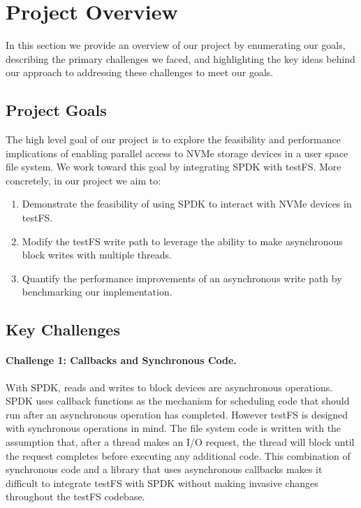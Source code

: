 \section{Project Overview}
In this section we provide an overview of our project by enumerating our goals,
describing the primary challenges we faced, and highlighting the key ideas
behind our approach to addressing these challenges to meet our goals.

\subsection{Project Goals}
The high level goal of our project is to explore the feasibility and
performance implications of enabling parallel access to NVMe storage devices in
a user space file system. We work toward this goal by integrating SPDK with
testFS. More concretely, in our project we aim to:

\begin{enumerate}
  \item Demonstrate the feasibility of using SPDK to interact with NVMe devices
    in testFS.
  \item Modify the testFS write path to leverage the ability to make
    asynchronous block writes with multiple threads.
  \item Quantify the performance improvements of an asynchronous write path by
    benchmarking our implementation.
\end{enumerate}

\subsection{Key Challenges}

\paragraph{Challenge 1: Callbacks and Synchronous Code.}
With SPDK, reads and writes to block devices are asynchronous operations. SPDK
uses callback functions as the mechanism for scheduling code that should run
after an asynchronous operation has completed. However testFS is designed with
synchronous operations in mind. The file system code is written with the
assumption that, after a thread makes an I/O request, the thread will block
until the request completes before executing any additional code. This
combination of synchronous code and a library that uses asynchronous callbacks
makes it difficult to integrate testFS with SPDK without making invasive
changes throughout the testFS codebase.

